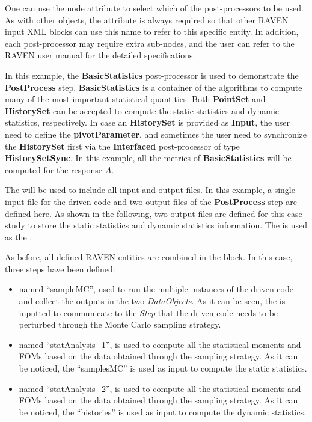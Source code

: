 One can use the node attribute  to select which of the post-processors to be used. As with other
objects, the attribute  is always required so that other RAVEN input XML blocks can use this name
to refer to this specific entity. In addition, each post-processor may require extra sub-nodes, and the user can refer
to the RAVEN user manual for the detailed specifications.

In this example, the \textbf{BasicStatistics} post-processor is used to demonstrate the \textbf{PostProcess} step.
\textbf{BasicStatistics} is a container of the algorithms to compute many of the most important statistical quantities.
Both \textbf{PointSet} and \textbf{HistorySet} can be accepted to compute the static statistics and dynamic statistics,
respectively. In case an \textbf{HistorySet} is provided as \textbf{Input}, the user need to define the \textbf{pivotParameter},
and sometimes the user need to synchronize the \textbf{HistorySet} first via the \textbf{Interfaced} post-processor of
type \textbf{HistorySetSync}.
In this example, all the metrics of \textbf{BasicStatistics} will be computed for the response $A$.

The  will be used to include all input and output files. In this example, a single input file
for the driven code and two output files of the \textbf{PostProcess} step are defined here. As shown in the following,
two output files are defined for this case study to store the static statistics and dynamic statistics information.
The  is used as the .


As before, all defined RAVEN entities are combined in the  block.
In this case, three steps have been defined:

\begin{itemize}
  \item {} named ``sampleMC'', used to run the multiple instances of the driven code and
     collect the outputs in the two \textit{DataObjects}. As it can be seen, the  is inputted
     to communicate to the \textit{Step} that the driven code needs to be perturbed through the Monte Carlo sampling
     strategy.
  \item {} named ``statAnalysis\_1'', is used to compute all the statistical moments and FOMs
    based on the data obtained through the sampling strategy. As it can be noticed, the 
    ``samplesMC'' is used as input to compute the static statistics.
  \item {} named ``statAnalysis\_2'', is used to compute all the statistical moments and FOMs
    based on the data obtained through the sampling strategy. As it can be noticed, the 
    ``histories'' is used as input to compute the dynamic statistics.
\end{itemize}

